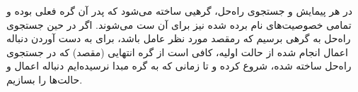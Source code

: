 در هر پیمایش و جستجوی راه‌حل، گرهیی ساخته می‌شود که پدر آن گره فعلی بوده و تمامی خصوصیت‌های نام برده شده نیز برای آن ست می‌شوند. اگر در حین جستجوی راه‌حل به گرهی برسیم که رمقصد مورد نظر عامل باشد، برای به دست آوردن دنباله اعمال انجام شده از حالت اولیه، کافی است از گره انتهایی (مقصد) که در جستجوی راه‌حل ساخته شده، شروع کرده و تا زمانی که به گره مبدا نرسیده‌ایم دنباله اعمال و حالت‌ها را بسازیم.
	
	
	
	
	

	
	
	
	
	
	
	
	
